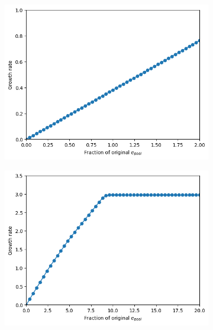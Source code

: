 \begin{figure}
  \begin{subfigure}[htpb]{0.45\textwidth}
   \centering
   \includegraphics[width=\textwidth]{epool_ec_gr}
   \caption{
   }
   \label{fig:model-pool-growthrate}
  \end{subfigure}%
  \begin{subfigure}[htpb]{0.45\textwidth}
   \centering
   \includegraphics[width=\textwidth]{epool_ec_gr_20}
   \caption{
   }
   \label{fig:model-pool-growthrate-20}
  \end{subfigure}


\end{figure}
